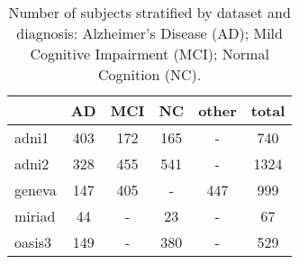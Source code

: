 
\begin{table}
\centering
\caption{
Number of subjects stratified by dataset and diagnosis:
Alzheimer's Disease (AD);
Mild Cognitive Impairment (MCI);
Normal Cognition (NC).
}
\label{tab:dx_stratification}
\begin{tabular}{lccccc}
\toprule
   &     AD &    MCI &     NC &  other & total \\
\midrule
adni1   &  403 &  172 &  165 &   -  &  740 \\
adni2   &  328 &  455 &  541 &   -  & 1324 \\
geneva  &  147 &  405 &    - &  447 &  999 \\
miriad  &   44 &   -  &   23 &   -  &   67 \\
oasis3  &  149 &    - &  380 &   -  &  529 \\
\bottomrule
\end{tabular}
\end{table}


